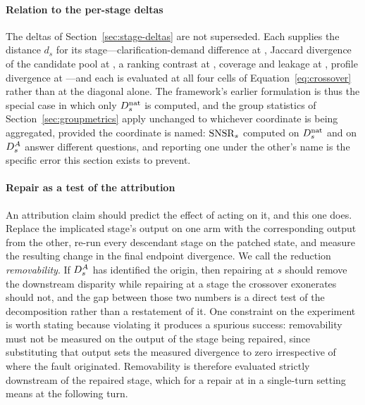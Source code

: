 \paragraph{Relation to the per-stage deltas}
The deltas of Section~\ref{sec:stage-deltas} are not superseded. Each supplies the distance $d_s$
for its stage---clarification-demand difference at , Jaccard divergence of the
candidate pool at , a ranking contrast at , coverage and leakage at
, profile divergence at ---and each is evaluated at all four cells of
Equation~\eqref{eq:crossover} rather than at the diagonal alone. The framework's earlier
formulation is thus the special case in which only $D^{\mathrm{nat}}_s$ is computed, and the group statistics
of Section~\ref{sec:groupmetrics} apply unchanged to whichever coordinate is being aggregated,
provided the coordinate is named: $\mathrm{SNSR}_s$ computed on $D^{\mathrm{nat}}_s$ and on $D^{A}_s$ answer different
questions, and reporting one under the other's name is the specific error this section exists to
prevent.

\paragraph{Repair as a test of the attribution}
An attribution claim should predict the effect of acting on it, and this one does. Replace the
implicated stage's output on one arm with the corresponding output from the other, re-run every
descendant stage on the patched state, and measure the resulting change in the final endpoint
divergence. We call the reduction \emph{removability}. If $D^{A}_s$ has identified the origin, then
repairing at $s$ should remove the downstream disparity while repairing at a stage the crossover
exonerates should not, and the gap between those two numbers is a direct test of the decomposition
rather than a restatement of it. One constraint on the experiment is worth stating because
violating it produces a spurious success: removability must not be measured on the output of the
stage being repaired, since substituting that output sets the measured divergence to zero
irrespective of where the fault originated. Removability is therefore evaluated strictly
downstream of the repaired stage, which for a repair at  in a single-turn setting
means at the following turn.

